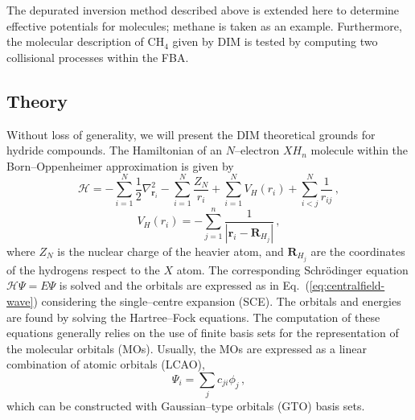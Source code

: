 \documentclass[10pt]{article}
\begin{document}
The depurated inversion method described above is extended here to 
determine effective potentials for molecules; methane is taken as an
example. Furthermore, the molecular description of CH$_4$ given by 
DIM is tested by computing two collisional processes within the FBA.

\subsection{Theory}

Without loss of generality, we will present the DIM theoretical grounds 
for hydride compounds. The Hamiltonian of an $N$--electron $X\!H_n$ 
molecule within the Born--Oppenheimer approximation is given by
\begin{equation}
 \mathcal{H}=-\sum_{i=1}^N \frac{1}{2} \nabla^2_{\mathbf{r}_i} 
 - \sum_{i=1}^N \frac{Z_N}{r_i} 
 + \sum_{i=1}^N V_H(r_i)
 + \sum_{i<j}^N \frac{1}{r_{ij}}\,,
\end{equation}
\begin{equation}
 V_H(r_i) = -\sum_{j=1}^{n} \frac{1}{\left|\mathbf{r}_i-\mathbf{R}_{H_j}\right|}\,,
\end{equation}
where $Z_N$ is the nuclear charge of the heavier atom, and 
$\mathbf{R}_{H_j}$ are the coordinates of the hydrogens respect to 
the $X$ atom. The corresponding Schr\"odinger equation 
$\mathcal{H}\Psi=E\Psi$ is solved and the orbitals are expressed as
in Eq.~(\ref{eq:centralfield-wave}) considering the single--centre
expansion (SCE). The orbitals and energies are found by solving the 
Hartree--Fock equations. The computation of these 
equations generally relies on the use of finite basis sets for the 
representation of the molecular orbitals (MOs). Usually, the MOs are 
expressed as a linear combination of atomic orbitals (LCAO),
\begin{equation}
 \Psi_i=\sum_j c_{ji} \phi_j\,,
\end{equation}
which can be constructed with Gaussian--type orbitals (GTO) basis 
sets. 
\end{document}
